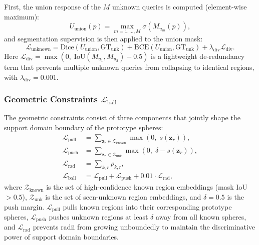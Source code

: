 \documentclass[3p,twocolumn,authoryear]{elsarticle}
\newcommand{\bz}{\mathbf{z}}                              %
\begin{document}
First, the union response of the $M$ unknown queries is computed (element-wise maximum):
\begin{equation}\label{eq:u_union}
  U_{\text{union}}(p) = \max_{m=1,\ldots,M} \sigma\!\left(M_{u_m}(p)\right),
\end{equation}
and segmentation supervision is then applied to the union mask:
\begin{equation}\label{eq:loss_unknown}
  \mathcal{L}_{\text{unknown}} = \text{Dice}(U_{\text{union}}, \text{GT}_{\text{unk}}) + \text{BCE}(U_{\text{union}}, \text{GT}_{\text{unk}}) + \lambda_{\text{div}} \mathcal{L}_{\text{div}}.
\end{equation}
Here $\mathcal{L}_{\text{div}} = \max\!\left(0,\; \text{IoU}(M_{u_1}, M_{u_2}) - 0.5\right)$
is a lightweight de-redundancy term that prevents multiple unknown queries from
collapsing to identical regions, with $\lambda_{\text{div}} = 0.001$.

\subsubsection{Geometric Constraints $\mathcal{L}_{\text{ball}}$}\label{sec:method:loss:ball}

The geometric constraints consist of three components that jointly shape the support
domain boundary of the prototype spheres:
\begin{align}
  \mathcal{L}_{\text{pull}} &= \sum_{\bz_r \in \mathcal{Z}_{\text{known}}} \max\!\left(0,\; s(\bz_r)\right), \label{eq:loss_pull} \\
  \mathcal{L}_{\text{push}} &= \sum_{\bz_r \in \mathcal{Z}_{\text{unk}}} \max\!\left(0,\; \delta - s(\bz_r)\right), \label{eq:loss_push} \\
  \mathcal{L}_{\text{rad}} &= \sum_{k,r} \rho_{k,r}, \label{eq:loss_rad} \\
  \mathcal{L}_{\text{ball}} &= \mathcal{L}_{\text{pull}} + \mathcal{L}_{\text{push}} + 0.01 \cdot \mathcal{L}_{\text{rad}}, \label{eq:loss_ball}
\end{align}
where $\mathcal{Z}_{\text{known}}$ is the set of high-confidence known region embeddings
(mask IoU $> 0.5$), $\mathcal{Z}_{\text{unk}}$ is the set of seen-unknown region
embeddings, and $\delta = 0.5$ is the push margin.
$\mathcal{L}_{\text{pull}}$ pulls known regions into their corresponding prototype
spheres, $\mathcal{L}_{\text{push}}$ pushes unknown regions at least $\delta$ away
from all known spheres, and $\mathcal{L}_{\text{rad}}$ prevents radii from growing
unboundedly to maintain the discriminative power of support domain boundaries.
\end{document}
